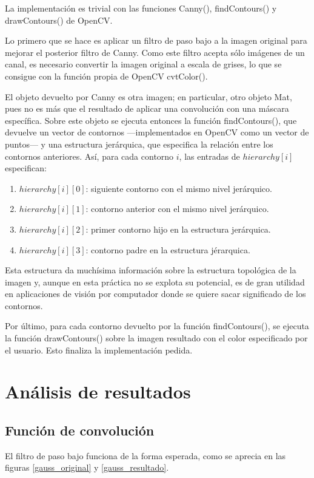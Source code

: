 \documentclass[a4paper, 11pt]{article}
\theoremstyle{definition}
\theoremstyle{theorem}
\begin{document}
  La implementación es trivial con las funciones Canny(), findContours() y drawContours() de OpenCV.

  Lo primero que se hace es aplicar un filtro de paso bajo a la imagen original para mejorar el posterior filtro de Canny. Como este filtro acepta sólo imágenes de un canal, es necesario convertir la imagen original a escala de grises, lo que se consigue con la función propia de OpenCV cvtColor().

  El objeto devuelto por Canny es otra imagen; en particular, otro objeto Mat, pues no es más que el resultado de aplicar una convolución con una máscara específica. Sobre este objeto se ejecuta entonces la función findContours(), que devuelve un vector de contornos ---implementados en OpenCV como un vector de puntos--- y una estructura jerárquica, que especifica la relación entre los contornos anteriores. Así, para cada contorno $i$, las entradas de $hierarchy[i]$ especifican:
  \begin{enumerate}
      \item $hierarchy[i][0]$: siguiente contorno con el mismo nivel jerárquico.
      \item $hierarchy[i][1]$: contorno anterior con el mismo nivel jerárquico.
      \item $hierarchy[i][2]$: primer contorno hijo en la estructura jerárquica.
      \item $hierarchy[i][3]$: contorno padre en la estructura jérarquica.
  \end{enumerate}

  Esta estructura da muchísima información sobre la estructura topológica de la imagen y, aunque en esta práctica no se explota su potencial, es de gran utilidad en aplicaciones de visión por computador donde se quiere sacar significado de los contornos.

  Por último, para cada contorno devuelto por la función findContours(), se ejecuta la función drawContours() sobre la imagen resultado con el color especificado por el usuario. Esto finaliza la implementación pedida.

  \newpage
  \section{Análisis de resultados}

  \subsection{Función de convolución}
  El filtro de paso bajo funciona de la forma esperada, como se aprecia en las figuras \ref{gauss_original} y \ref{gauss_resultado}.
\end{document}
